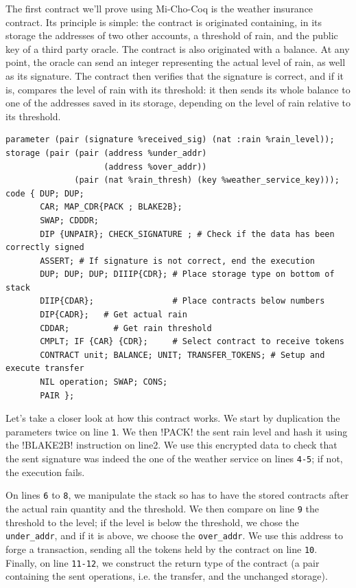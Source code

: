 \documentclass{report}
\begin{document}
The first contract we'll prove using Mi-Cho-Coq is the weather insurance contract. Its principle is simple: the contract is originated containing, in its storage the addresses of two other accounts, a threshold of rain, and the public key of a third party oracle. The contract is also originated with a balance. At any point, the oracle can send an integer representing the actual level of rain, as well as its signature. The contract then verifies that the signature is correct, and if it is, compares the level of rain with its threshold: it then sends its whole balance to one of the addresses saved in its storage, depending on the level of rain relative to its threshold.


\begin{lstlisting}[language=michelson]
parameter (pair (signature %received_sig) (nat :rain %rain_level));
storage (pair (pair (address %under_addr)
                    (address %over_addr))
              (pair (nat %rain_thresh) (key %weather_service_key)));
code { DUP; DUP;
       CAR; MAP_CDR{PACK ; BLAKE2B};
       SWAP; CDDDR;
       DIP {UNPAIR}; CHECK_SIGNATURE ; # Check if the data has been correctly signed
       ASSERT; # If signature is not correct, end the execution
       DUP; DUP; DUP; DIIIP{CDR}; # Place storage type on bottom of stack
       DIIP{CDAR};                # Place contracts below numbers
       DIP{CADR};   # Get actual rain
       CDDAR;         # Get rain threshold
       CMPLT; IF {CAR} {CDR};     # Select contract to receive tokens
       CONTRACT unit; BALANCE; UNIT; TRANSFER_TOKENS; # Setup and execute transfer
       NIL operation; SWAP; CONS;
       PAIR };
\end{lstlisting}

Let's take a closer look at how this contract works. We start by duplication the parameters twice on line \texttt{1}. We then !PACK! the sent rain level and hash it using the !BLAKE2B! instruction on line{2}. We use this encrypted data to check that the sent signature was indeed the one of the weather service on lines \texttt{4-5}; if not, the execution fails.

On lines \texttt{6} to \texttt{8}, we manipulate the stack so has to have the stored contracts after the actual rain quantity and the threshold. We then compare on line \texttt{9} the threshold to the level; if the level is below the threshold, we chose the \texttt{under\_addr}, and if it is above, we choose the \texttt{over\_addr}. We use this address to forge a transaction, sending all the tokens held by the contract on line \texttt{10}. Finally, on line \texttt{11-12}, we construct the return type of the contract (a pair containing the sent operations, i.e. the transfer, and the unchanged storage).\\
\end{document}

